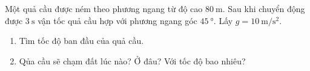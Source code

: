 \begin{ex}
	Một quả cầu được ném theo phương ngang từ độ cao $\SI{80}{\meter}$. Sau khi chuyển động được $\SI{3}{\second}$ vận tốc quả cầu hợp với phương ngang góc $\SI{45}{\degree}$. Lấy $g=\SI{10}{\meter/\second^2}$.
	\begin{enumerate}[label=\alph*)]
		\item Tìm tốc độ ban đầu của quả cầu.
		\item Qủa cầu sẽ chạm đất lúc nào? Ở đâu? Với tốc độ bao nhiêu?
	\end{enumerate}	
\end{ex}

